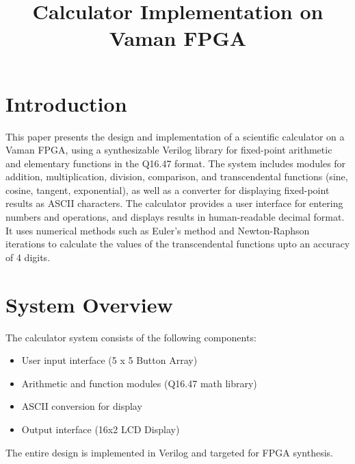 \documentclass[conference]{IEEEtran}
\title{Calculator Implementation on Vaman FPGA}
\author{
    \IEEEauthorblockN{Siddhanth Yellanki}
    \IEEEauthorblockA{Department of Electrical Engineering\\
    Indian Institute of Technology Hyderabad\\
    Email: ee24btech11059@iith.ac.in}
}
\begin{document}
\maketitle
\begin{FlushLeft}
\section{Introduction}
This paper presents the design and implementation of a scientific calculator on a Vaman FPGA, using a synthesizable Verilog library for fixed-point arithmetic and elementary functions in the Q16.47 format. The system includes modules for addition, multiplication, division, comparison, and transcendental functions (sine, cosine, tangent, exponential), as well as a converter for displaying fixed-point results as ASCII characters. The calculator provides a user interface for entering numbers and operations, and displays results in human-readable decimal format. It uses numerical methods such as Euler's method and Newton-Raphson iterations to calculate the values of the transcendental functions upto an accuracy of 4 digits.

\section{System Overview}
The calculator system consists of the following components:
\begin{itemize}
    \item User input interface (5 x 5 Button Array)
    \item Arithmetic and function modules (Q16.47 math library)
    \item ASCII conversion for display
    \item Output interface (16x2 LCD Display)
\end{itemize}
The entire design is implemented in Verilog and targeted for FPGA synthesis.
\begin{center}
\end{center}
\end{FlushLeft}
\end{document}
